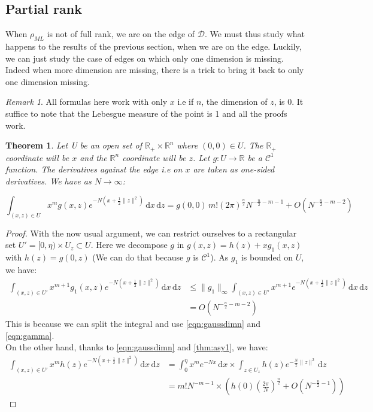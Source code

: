 \documentclass[10pt,a4paper]{report}
\theoremstyle{plain}
\newtheorem{thm}{Theorem}[chapter]
\theoremstyle{definition}
\theoremstyle{remark}
\newtheorem*{rem}{Remark}
\newcommand{\R}{\ensuremath{\mathbb{R}}}
\newcommand{\dd}{\mathrm{d}}
\renewcommand{\leq}{\leqslant}
\newcommand{\class}[1]{{\mathscr{C}^{#1}}}
\newcommand{\ml}{_{M\!L}}
\begin{document}
\subsection{Partial rank}

When $\rho\ml$ is not of full rank, we are on the edge of $\mathcal{D}$. We must
thus study what happens to the results of the previous section, when we are on
the edge. Luckily, we can just study the case of edges on which only one
dimension is missing. Indeed when more dimension are missing, there is a trick
to bring it back to only one dimension missing.

\begin{rem}
All formulas here work
with only $x$ i.e if $n$, the dimension of $z$, is 0. It suffice to note that the
Lebesgue measure of the point is 1 and all the proofs work.
\end{rem}

\begin{thm}\label{thm:asyp1}
  Let U be an open set of $\R_+ \times \R^n$ where $(0,0) \in U$. The $\R_+$
  coordinate will be $x$ and the $\R^n$ coordinate will be $z$. Let $g : U \to
  \R$ be a $\class 1$ function. The derivatives against the edge i.e on $x$ are
  taken as one-sided derivatives. We have as $N \to \infty$:

  \[\int_{(x,z) \in U} x^m g(x,z)e^{-N(x + \frac 12 \|z\|^2)} \,\dd x\, \dd z =
    g(0,0)\,m! {(2\pi)}^{\frac n 2} N^{-\frac n 2 - m - 1} + O(N^{-\frac n 2 - m - 2})\]
\end{thm}

\begin{proof} With the now usual argument, we can restrict ourselves to a
  rectangular set $U' = [0,\eta) \times U_z \subset U$.
  Here we decompose $g$ in $g(x,z) = h(z) + x g_1(x,z)$ with $h(z) = g(0,z)$ (We
  can do that because $g$ is $\class 1$). As
  $g_1$ is bounded on $U$, we have:
\begin{align*}
  \int_{(x,z) \in U'} x^{m+1}g_1(x,z)e^{-N(x + \frac 12 \|z\|^2)} \,\dd x\, \dd z
  &\leq
  \|g_1\|_\infty\int_{(x,z) \in U'} x^{m+1}e^{-N(x + \frac 12 \|z\|^2)} \,\dd x\, \dd z\\
    &=O(N^{-\frac n 2 - m - 2})
\end{align*}
This is because we can split the integral and use \cref{eqn:gaussdimn} and \cref{eqn:gamma}.\\
On the other hand, thanks to \cref{eqn:gaussdimn} and \cref{thm:asy1}, we have:
\begin{align*}
  \int_{(x,z) \in U'} x^{m}h(z)e^{-N(x + \frac 12 \|z\|^2)} \,\dd x\, \dd z
  &= \int_0^\eta x^{m}e^{-Nx} \,\dd x \times
    \int_{z \in U_z} h(z)e^{-\frac N2 \|z\|^2} \, \dd z\\
  &= m! N^{-m-1} \times( h(0){\left(\frac
      {2\pi}{N}\right)}^{\frac n 2} +
    O\left({N^{-\frac n 2 -1}}\right))
\end{align*}

\end{proof}
\end{document}
